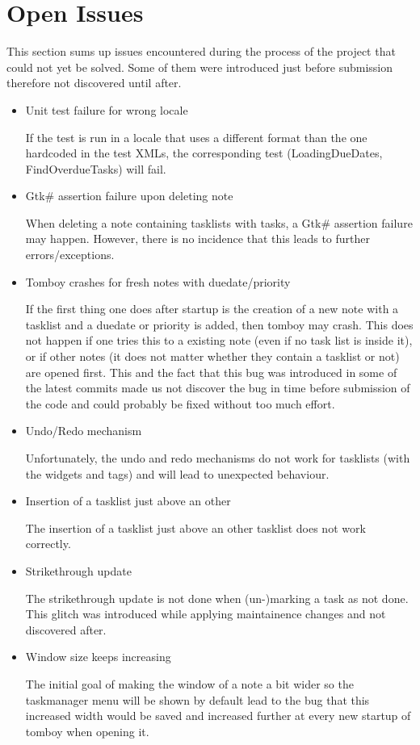 \section{Open Issues}
\label{issues}

This section sums up issues encountered during the process of the project that could not yet be solved.
Some of them were introduced just before submission therefore not discovered until after.

\begin{itemize}
\item Unit test failure for wrong locale

  If the test is run in a locale that uses a different format than the one hardcoded in the test XMLs, the corresponding test (LoadingDueDates, FindOverdueTasks) will fail.

\item Gtk\# assertion failure upon deleting note

  When deleting a note containing tasklists with tasks, a Gtk\# assertion failure may happen.
  However, there is no incidence that this leads to further errors/exceptions.

\item Tomboy crashes for fresh notes with duedate/priority

  If the first thing one does after startup is the creation of a new note with a tasklist and a duedate or priority is added, then tomboy may crash. This does not happen if one tries this to a existing note (even if no task list is inside it), or if other notes (it does not matter whether they contain a tasklist or not) are opened first. 
This and the fact that this bug was introduced in some of the latest commits made us not discover the bug in time before submission of the code and could probably be fixed without too much effort.

\item Undo/Redo mechanism

  Unfortunately, the undo and redo mechanisms do not work for tasklists (with the widgets and tags) and will lead to unexpected behaviour.

\item Insertion of a tasklist just above an other

  The insertion of a tasklist just above an other tasklist does not work correctly.

\item Strikethrough update
  
  The strikethrough update is not done when (un-)marking a task as not done.
  This glitch was introduced while applying maintainence changes and not discovered after.

\item Window size keeps increasing

  The initial goal of making the window of a note a bit wider so the taskmanager menu will be shown by default lead to the bug that this increased width would be saved and increased further at every new startup of tomboy when opening it.

\end{itemize}
